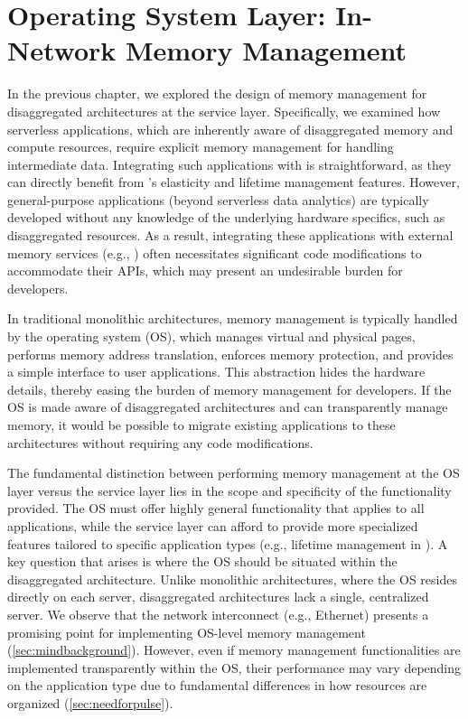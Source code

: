\chapter{Operating System Layer: In-Network Memory Management}
\label{chap:os}
In the previous chapter, we explored the design of memory management for disaggregated architectures at the service layer. Specifically, we examined how serverless applications, which are inherently aware of disaggregated memory and compute resources, require explicit memory management for handling intermediate data. Integrating such applications with \jiffy is straightforward, as they can directly benefit from \jiffy's elasticity and lifetime management features. However, general-purpose applications (beyond serverless data analytics) are typically developed without any knowledge of the underlying hardware specifics, such as disaggregated resources. As a result, integrating these applications with external memory services (e.g., \jiffy) often necessitates significant code modifications to accommodate their APIs, which may present an undesirable burden for developers.

In traditional monolithic architectures, memory management is typically handled by the operating system (OS), which manages virtual and physical pages, performs memory address translation, enforces memory protection, and provides a simple interface to user applications. This abstraction hides the hardware details, thereby easing the burden of memory management for developers. If the OS is made aware of disaggregated architectures and can transparently manage memory, it would be possible to migrate existing applications to these architectures without requiring any code modifications. 

The fundamental distinction between performing memory management at the OS layer versus the service layer lies in the scope and specificity of the functionality provided. The OS must offer highly general functionality that applies to all applications, while the service layer can afford to provide more specialized features tailored to specific application types (e.g., lifetime management in \jiffy). A key question that arises is where the OS should be situated within the disaggregated architecture. Unlike monolithic architectures, where the OS resides directly on each server, disaggregated architectures lack a single, centralized server. We observe that the network interconnect (e.g., Ethernet) presents a promising point for implementing OS-level memory management (\ref{sec:mindbackground}). However, even if memory management functionalities are implemented transparently within the OS, their performance may vary depending on the application type due to fundamental differences in how resources are organized (\ref{sec:needforpulse}).

